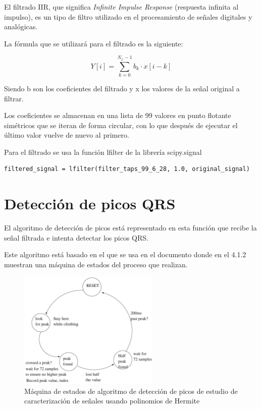 El filtrado IIR, que significa \textit{Infinite Impulse Response} (respuesta infinita al impulso),
es un tipo de filtro utilizado en el procesamiento de señales digitales y analógicas.

La fórmula que se utilizará para el filtrado es la siguiente:

\[ Y[i] = \sum_{k=0}^{N_x -1} b_k \cdot x[i-k] \]

Siendo b son los coeficientes del filtrado y x los valores de la señal original a filtrar.

Los coeficientes se almacenan en una lista de 99 valores en punto flotante simétricos que se iteran de forma 
circular, con lo que después de ejecutar el último valor vuelve de nuevo al primero.  

Para el filtrado se usa la función lfilter de la librería scipy.signal

\lstset{language=python, breaklines=true, basicstyle=\footnotesize}
\begin{lstlisting}[frame=single]
    filtered_signal = lfilter(filter_taps_99_6_28, 1.0, original_signal)
\end{lstlisting}

\section{Detección de picos QRS}

El algoritmo de detección de picos está representado en esta función que 
recibe la señal filtrada e intenta detectar los picos QRS.

Este algoritmo está basado en el que se usa en el documento \cite{desai2021low} 
donde en el 4.1.2 muestran una máquina de estados del proceso que realizan.

\begin{figure}[h!]
    \centering
    \includegraphics[width=0.6\textwidth]{./Images/img_algoritmo/fsm_mdpi.png}
    \caption{Máquina de estados de algoritmo de detección de picos de estudio de caracterización de señales usando polinomios de Hermite}
    \label{fig:fsm_mpdi}
\end{figure}

